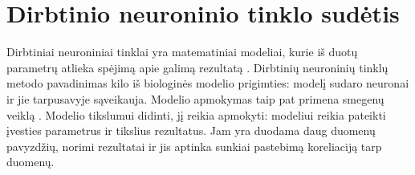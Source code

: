 \documentclass{VUMIFInfKursinis}
\begin{document}

\tableofcontents

\section{Dirbtinio neuroninio tinklo sudėtis}
Dirbtiniai neuroniniai tinklai yra matematiniai modeliai,
kurie iš duotų parametrų atlieka spėjimą apie galimą rezultatą \cite{salt24}.
Dirbtinių neuroninių tinklų metodo pavadinimas
kilo iš biologinės modelio prigimties: modelį sudaro neuronai
ir jie tarpusavyje sąveikauja. Modelio apmokymas taip pat primena 
smegenų veiklą \cite{salt24}. Modelio tikslumui didinti, jį reikia apmokyti: modeliui reikia pateikti įvesties parametrus
ir tikslius rezultatus. Jam yra duodama daug duomenų pavyzdžių, norimi rezultatai ir jis aptinka
sunkiai pastebimą koreliaciją tarp duomenų.
\end{document}
